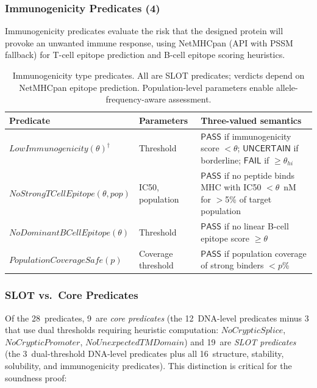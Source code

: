 \documentclass[acmsmall,review,anonymous]{acmart}
\newcommand{\PASS}{\ensuremath{\mathsf{PASS}}\xspace}
\newcommand{\FAIL}{\ensuremath{\mathsf{FAIL}}\xspace}
\newcommand{\UNCERTAIN}{\ensuremath{\mathsf{UNCERTAIN}}\xspace}
\begin{document}
\subsubsection{Immunogenicity Predicates (4)}

Immunogenicity predicates evaluate the risk that the designed protein
will provoke an unwanted immune response, using NetMHCpan (API with
PSSM fallback) for T-cell epitope prediction and B-cell epitope
scoring heuristics.

\begin{table}[t]
\centering
\caption{Immunogenicity type predicates. All are SLOT predicates;
         verdicts depend on NetMHCpan epitope prediction.
         Population-level parameters enable allele-frequency-aware
         assessment.}
\label{tab:imm-predicates}
\begin{tabular}{llp{4.6cm}}
\toprule
\textbf{Predicate} & \textbf{Parameters} & \textbf{Three-valued semantics} \\
\midrule
$\mathit{LowImmunogenicity}(\theta)^\dagger$ & Threshold &
  \PASS{} if immunogenicity score $< \theta$; \UNCERTAIN{} if
  borderline; \FAIL{} if $\ge \theta_{\mathit{hi}}$ \\
$\mathit{NoStrongTCellEpitope}(\theta,\mathit{pop})$ & IC50, population &
  \PASS{} if no peptide binds MHC with IC50 $< \theta$~nM for
  $>$5\% of target population \\
$\mathit{NoDominantBCellEpitope}(\theta)$ & Threshold &
  \PASS{} if no linear B-cell epitope score $\ge \theta$ \\
$\mathit{PopulationCoverageSafe}(p)$ & Coverage threshold &
  \PASS{} if population coverage of strong binders $< p$\% \\
\bottomrule
\end{tabular}
\end{table}

\subsubsection{SLOT vs.\ Core Predicates}

Of the 28~predicates, 9~are \emph{core predicates} (the 12~DNA-level
predicates minus 3 that use dual thresholds requiring heuristic
computation: $\mathit{NoCrypticSplice}$, $\mathit{NoCrypticPromoter}$,
$\mathit{NoUnexpectedTMDomain}$) and 19~are \emph{SLOT predicates}
(the 3~dual-threshold DNA-level predicates plus all 16~structure,
stability, solubility, and immunogenicity predicates).
This distinction is critical for the soundness proof:
\end{document}
